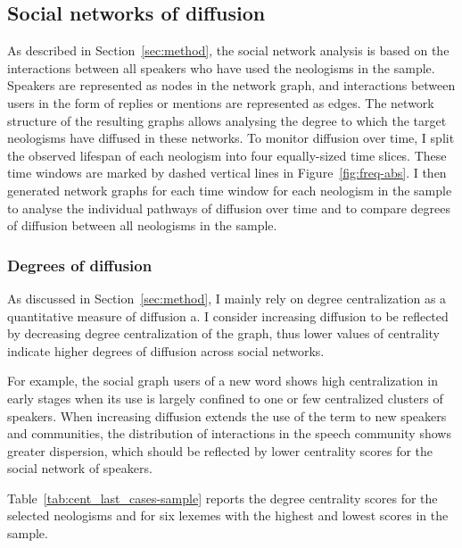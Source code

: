 \documentclass[
  a4paper,
  abstract=on,
  captions=tableabove,
  ]{scrartcl}
\begin{document}
  \subsection{Social networks of diffusion}
    \label{subsec:sna}

    As described in Section~\ref{sec:method}, the social network analysis is based on the interactions between all speakers who have used the neologisms in the sample. Speakers are represented as nodes in the network graph, and interactions between users in the form of replies or mentions are represented as edges. The network structure of the resulting graphs allows analysing the degree to which the target neologisms have diffused in these networks. To monitor diffusion over time, I split the observed lifespan of each neologism into four equally-sized time slices. These time windows are marked by dashed vertical lines in Figure~\ref{fig:freq-abs}. I then generated network graphs for each time window for each neologism in the sample to analyse the individual pathways of diffusion over time and to compare degrees of diffusion between all neologisms in the sample.

    \subsubsection{Degrees of diffusion}
      \label{subsec:degrees-of-diffusion}

      As discussed in Section~\ref{sec:method}, I mainly rely on degree centralization as a quantitative measure of diffusion a. I consider increasing diffusion to be reflected by decreasing degree centralization of the graph, thus lower values of centrality indicate higher degrees of diffusion across social networks.

      For example, the social graph users of a new word shows high centralization in early stages when its use is largely confined to one or few centralized clusters of speakers. When increasing diffusion extends the use of the term to new speakers and communities, the distribution of interactions in the speech community shows greater dispersion, which should be reflected by lower centrality scores for the social network of speakers.

      Table~\ref{tab:cent_last_cases-sample} reports the degree centrality scores for the selected neologisms and for six lexemes with the highest and lowest scores in the sample.
\end{document}
